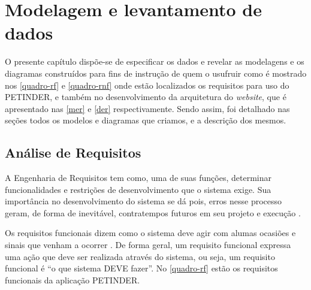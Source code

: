 \chapter{Modelagem e levantamento de dados}
O presente capítulo dispõe-se de especificar os dados e revelar as modelagens e os diagramas construídos para fins de instrução de quem o usufruir como é mostrado nos \autoref{quadro-rf} e \autoref{quadro-rnf} onde estão localizados os requisitos para uso do PETINDER, e também no desenvolvimento da arquitetura do \textit{website}, que é apresentado nas \autoref{mer} e \autoref{der} respectivamente. Sendo assim, foi detalhado nas seções todos os modelos e diagramas que criamos, e a descrição dos mesmos.

\section{Análise de Requisitos}
A Engenharia de Requisitos tem como, uma de suas funções, determinar funcionalidades e restrições de desenvolvimento que o sistema exige. Sua importância no desenvolvimento do sistema se dá pois, erros nesse processo geram, de forma de inevitável, contratempos futuros em seu projeto e execução \cite{analise}.

Os requisitos funcionais dizem como o sistema deve agir com alumas ocasiões e sinais que venham a ocorrer \cite{analise}. De forma geral, um requisito funcional expressa uma ação que deve ser realizada através do sistema, ou seja, um requisito funcional é “o que sistema DEVE fazer”.  No \autoref{quadro-rf} estão os requisitos funcionais da aplicação PETINDER.

